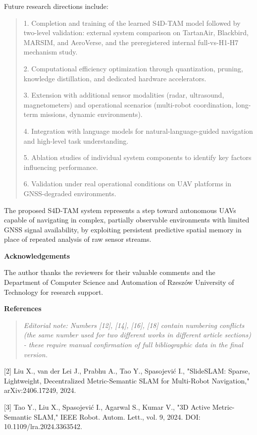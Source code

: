 \documentclass[
]{article}
\begin{document}
Future research directions include:

\begin{quote}
1. Completion and training of the learned S4D-TAM model followed by
two-level validation: external system comparison on TartanAir,
Blackbird, MARSIM, and AeroVerse, and the preregistered internal
full-vs-H1-H7 mechanism study.

2. Computational efficiency optimization through quantization, pruning,
knowledge distillation, and dedicated hardware accelerators.

3. Extension with additional sensor modalities (radar, ultrasound,
magnetometers) and operational scenarios (multi-robot coordination,
long-term missions, dynamic environments).

4. Integration with language models for natural-language-guided
navigation and high-level task understanding.

5. Ablation studies of individual system components to identify key
factors influencing performance.

6. Validation under real operational conditions on UAV platforms in
GNSS-degraded environments.
\end{quote}

The proposed S4D-TAM system represents a step toward autonomous UAVs
capable of navigating in complex, partially observable environments with
limited GNSS signal availability, by exploiting persistent predictive
spatial memory in place of repeated analysis of raw sensor streams.

\textbf{Acknowledgements}

The author thanks the reviewers for their valuable comments and the
Department of Computer Science and Automation of Rzeszów University of
Technology for research support.

\textbf{References}

\begin{quote}
\emph{Editorial note: Numbers {[}12{]}, {[}14{]}, {[}16{]}, {[}18{]}
contain numbering conflicts (the same number used for two different
works in different article sections) - these require manual confirmation
of full bibliographic data in the final version.}
\end{quote}

{[}2{]} Liu X., van der Lei J., Prabhu A., Tao Y., Spasojević I.,
"SlideSLAM: Sparse, Lightweight, Decentralized Metric-Semantic SLAM for
Multi-Robot Navigation," arXiv:2406.17249, 2024.

{[}3{]} Tao Y., Liu X., Spasojević I., Agarwal S., Kumar V., "3D Active
Metric-Semantic SLAM," IEEE Robot. Autom. Lett., vol. 9, 2024. DOI:
10.1109/lra.2024.3363542.
\end{document}
